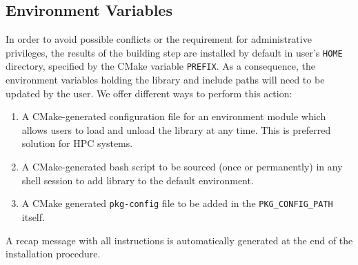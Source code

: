 \documentclass[edipack_sp.tex]{subfiles}
\begin{document}
\subsection{Environment Variables}\label{sSecInstallOSloading}
In order to avoid possible conflicts or the requirement for administrative
privileges, the results of the building step are installed by default in user's {\tt HOME}
directory, specified by the CMake variable {\tt PREFIX}.
As a consequence, the environment variables holding the library and include paths will need to be updated by the user.
We offer different ways to perform this action:
\begin{enumerate}
\item  A CMake-generated configuration file for an environment module which allows users to load and unload the library at any time. This is
  preferred solution for HPC systems. 
\item A CMake-generated bash script to be sourced (once or
  permanently) in any shell session to add \NAME library to the
  default environment.
\item A CMake generated {\tt pkg-config} file to be added in
  the {\tt PKG\_CONFIG\_PATH} itself.  
\end{enumerate}
A recap message with all instructions is automatically generated at the end of the installation procedure.

\ifSubfilesClassLoaded{
  
}{}
\end{document}
